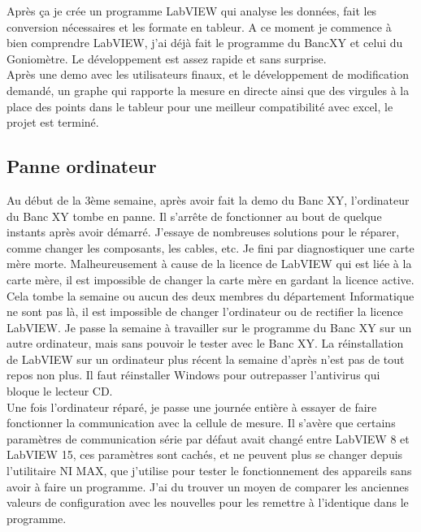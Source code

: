 \documentclass[12pt]{article}
\begin{document}
  

Après ça je crée un programme LabVIEW qui analyse les données, fait les conversion nécessaires et les formate en tableur.
A ce moment je commence à bien comprendre LabVIEW, j'ai déjà fait le programme du BancXY et celui du Goniomètre.
Le développement est assez rapide et sans surprise.\\
Après une demo avec les utilisateurs finaux, et le développement de modification demandé, un graphe qui rapporte la mesure en directe ainsi que des virgules à la place des points dans le tableur pour une meilleur compatibilité avec excel, le projet est terminé.

\newpage
\subsection{ Panne ordinateur }

Au début de la 3ème semaine, après avoir fait la demo du Banc XY, l'ordinateur du Banc XY tombe en panne.
Il s'arrête de fonctionner au bout de quelque instants après avoir démarré.
J'essaye de nombreuses solutions pour le réparer, comme changer les composants, les cables, etc.
Je fini par diagnostiquer une carte mère morte.
Malheureusement à cause de la licence de LabVIEW qui est liée à la carte mère, il est impossible de changer la carte mère en gardant la licence active.\\
Cela tombe la semaine ou aucun des deux membres du département Informatique ne sont pas là, il est impossible de changer l'ordinateur ou de rectifier la licence LabVIEW.
Je passe la semaine à travailler sur le programme du Banc XY sur un autre ordinateur, mais sans pouvoir le tester avec le Banc XY.
La réinstallation de LabVIEW sur un ordinateur plus récent la semaine d'après n'est pas de tout repos non plus.
Il faut réinstaller Windows pour outrepasser l'antivirus qui bloque le lecteur CD.\\
Une fois l'ordinateur réparé, je passe une journée entière à essayer de faire fonctionner la communication avec la cellule de mesure.
Il s'avère que certains paramètres de communication série par défaut avait changé entre LabVIEW 8 et LabVIEW 15, ces paramètres sont cachés, et ne peuvent plus se changer depuis l'utilitaire NI MAX, que j'utilise pour tester le fonctionnement des appareils sans avoir à faire un programme.
J'ai du trouver un moyen de comparer les anciennes valeurs de configuration avec les nouvelles pour les remettre à l'identique dans le programme.
\end{document}
